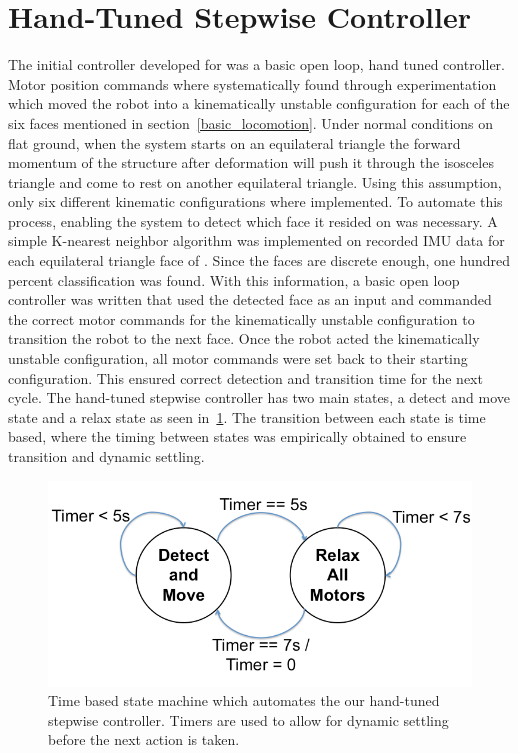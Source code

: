 \section{Hand-Tuned Stepwise Controller}
\label{hand_stepwise}
The initial controller developed for \SB{} was a basic open loop, hand tuned controller.
Motor position commands where systematically found through experimentation which moved the robot into a kinematically unstable configuration for each of the six faces mentioned in section~\ref{basic_locomotion}.
Under normal conditions on flat ground, when the system starts on an equilateral triangle the forward momentum of the structure after deformation will push it through the isosceles triangle and come to rest on another equilateral triangle.
Using this assumption, only six different kinematic configurations where implemented.
To automate this process, enabling the system to detect which face it resided on was necessary.
A simple K-nearest neighbor algorithm was implemented on recorded IMU data for each equilateral triangle face of \SB{}.
Since the faces are discrete enough, one hundred percent classification was found.
With this information, a basic open loop controller was written that used the detected face as an input and commanded the correct motor commands for the kinematically unstable configuration to transition the robot to the next face.
Once the robot acted the kinematically unstable configuration, all motor commands were set back to their starting configuration.
This ensured correct detection and transition time for the next cycle.
The hand-tuned stepwise controller has two main states, a detect and move state and a relax state as seen in~\ref{fig:stepwise_fsm}.
The transition between each state is time based, where the timing between states was empirically obtained to ensure transition and dynamic settling.

\label{hand_stepwise}
\begin{figure}[thpb]
      \centering
      \includegraphics[width=0.7\columnwidth]{tex/img/Stepwise_state_machine/Slide1_fixed}
      \caption{Time based state machine which automates the our hand-tuned stepwise controller. Timers are used to allow for dynamic settling before the next action is taken.}
      \label{fig:stepwise_fsm}
\end{figure}

